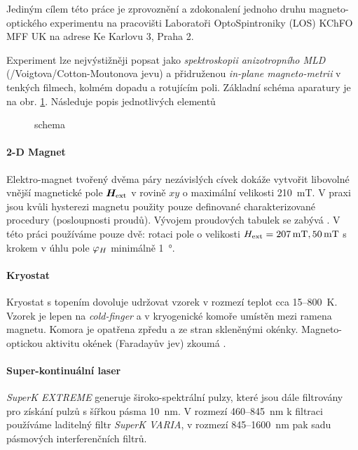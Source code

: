 Jediným cílem této práce je zprovoznění a zdokonalení jednoho druhu magneto-optického experimentu na pracovišti Laboratoři OptoSpintroniky (LOS) KChFO MFF UK na adrese Ke Karlovu 3, Praha 2.

Experiment lze nejvýstižněji popsat jako \emph{spektroskopii anizotropního MLD} (/Voigtova/Cotton-Moutonova jevu) a přidruženou \emph{in-plane magneto-metrii} v tenkých filmech, kolmém dopadu a rotujícím poli.
Základní schéma aparatury je na obr. \ref{fig:zakladni-schema}.
Následuje popis jednotlivých elementů

\begin{figure}[htbp]
    \centering
    \caption{schema}
    \label{fig:zakladni-schema}
\end{figure}

\paragraph{2-D Magnet}
Elektro-magnet tvořený dvěma páry nezávislých cívek dokáže vytvořit libovolné vnější magnetické pole $\bm{H}_\textrm{ext}$ v rovině $xy$ o maximální velikosti \SI{210}{\milli\tesla}.
V praxi jsou kvůli hysterezi magnetu použity pouze definované charakterizované procedury (posloupnosti proudů).
Vývojem proudových tabulek se zabývá \cite{kimakCharakterizaciaDvojdimenzionalnehoElektromagnetu2017,kimakOptickaSpektroskopieAntiferomagnetu2019}.
V této práci používáme pouze dvě: rotaci pole o velikosti $H_\textrm{ext}=\SI{207}{\milli\tesla}, \SI{50}{\milli\tesla}$ s krokem v úhlu pole $\varphi_H$ minimálně \SI{1}{\degree}.

\paragraph{Kryostat}
Kryostat s topením dovoluje udržovat vzorek v rozmezí teplot cca 15--\SI{800}{\kelvin}.
Vzorek je lepen na \emph{cold-finger} a v kryogenické komoře umístěn mezi ramena magnetu.
Komora je opatřena zpředu a ze stran skleněnými okénky.
Magneto-optickou aktivitu okének (Faradayův jev) zkoumá \cite{baduraMagnetooptickaMereniPro2019}.

\paragraph{Super-kontinuální laser}
\emph{SuperK EXTREME} generuje široko-spektrální pulzy, které jsou dále filtrovány pro získání pulzů s šířkou pásma \SI{10}{\nano\meter}.
V rozmezí \num{460}--\SI{845}{\nano\meter} k filtraci používáme laditelný filtr \emph{SuperK VARIA}, v rozmezí \num{845}--\SI{1600}{\nano\meter} pak sadu pásmových interferenčních filtrů.

